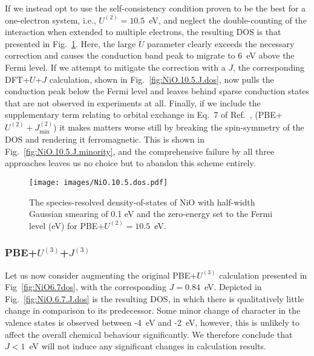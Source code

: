 If we instead opt to use the self-consistency condition 
proven to be the best for a one-electron system, 
i.e., $U^{(2)}=10.5$~eV, 
and neglect the double-counting of the interaction 
when extended to multiple electrons,  
the resulting DOS is that presented in Fig.~\ref{fig:NiO.10.5.dos}.
%
Here, the large $U$ parameter 
clearly exceeds the necessary correction 
and causes the conduction band peak 
to migrate to 6~eV above the Fermi level.
%
If we attempt to mitigate the correction with a $J$, 
the corresponding DFT+$U$+$J$ calculation, 
shown in Fig.~\ref{fig:NiO.10.5.J.dos}, 
now pulls the conduction peak below the Fermi level 
and leaves behind sparse conduction states 
that are not observed in experiments at all.
%
%
Finally, 
if we include the supplementary term 
relating to orbital exchange in 
Eq.~7 of Ref.~\cite{PhysRevB.84.115108}, 
(PBE+$U^{(2)}+J_\textrm{min}^{(2)}$)
it makes matters worse still by breaking 
the spin-symmetry of the DOS 
and rendering it ferromagnetic.
% 
This is shown in Fig.~\ref{fig:NiO.10.5.J.minority}, 
and the comprehensive failure by all three approaches 
leaves us no choice but to abandon this scheme entirely.

\begin{figure}[th!]
\centering
\texttt{[image: images/NiO.10.5.dos.pdf]}
\caption[NiO DOS with $U=10.5$~eV and $J=0$~eV]
{The species-resolved density-of-states of NiO 
with half-width Gaussian smearing of 0.1 eV 
and the zero-energy set to the Fermi level (eV) for 
PBE+$U^{(2)}=10.5$~eV.}
\label{fig:NiO.10.5.dos}
\end{figure}


\subsubsection{PBE+$U^{(3)}$+$J^{(3)}$}

Let us now consider augmenting 
the original PBE+$U^{(3)}$ calculation presented in 
Fig~\ref{fig:NiO6.7dos}, 
with the corresponding $J=0.84$~eV.
%
Depicted in Fig.~\ref{fig:NiO.6.7.J.dos} 
is the resulting DOS, 
in which there is qualitatively little change 
in comparison to its predecessor.
%
Some minor change of character 
in the valence states is observed 
between -4~eV and -2~eV, 
however, this is unlikely 
to affect the overall chemical behaviour significantly.
%
We therefore conclude that $J<1$~eV 
will not induce any significant 
changes in calculation results.

